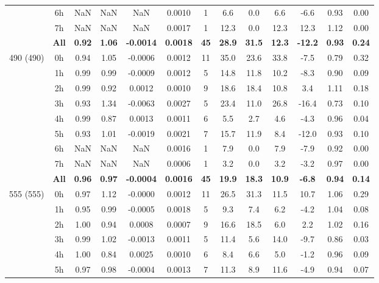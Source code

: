 \documentclass[preview]{standalone}
\begin{document}
\begin{tabular}{ccccccccccccc}
 & 6h  & NaN & NaN & NaN & 0.0010 &  1 & 6.6 & 0.0 & 6.6 & -6.6 & 0.93 & 0.00 \\ 
 & 7h  & NaN & NaN & NaN & 0.0017 &  1 & 12.3 & 0.0 & 12.3 & 12.3 & 1.12 & 0.00 \\ \cline{2-13}
& \textbf{All} & \textbf{0.92} & \textbf{1.06} & \textbf{-0.0014} & \textbf{0.0018} & \textbf{45} & \textbf{28.9} & \textbf{31.5} & \textbf{12.3} & \textbf{-12.2} & \textbf{0.93} & \textbf{0.24} \\ \hline
\multirow{9}{*}{490 (490)} & 0h & 0.94 & 1.05 & -0.0006 & 0.0012 & 11 & 35.0 & 23.6 & 33.8 & -7.5 & 0.79 & 0.32 \\ 
 & 1h  & 0.99 & 0.99 & -0.0009 & 0.0012 &  5 & 14.8 & 11.8 & 10.2 & -8.3 & 0.90 & 0.09 \\ 
 & 2h  & 0.99 & 0.92 & 0.0012 & 0.0010 &  9 & 18.6 & 18.4 & 10.8 & 3.4 & 1.11 & 0.18 \\ 
 & 3h  & 0.93 & 1.34 & -0.0063 & 0.0027 &  5 & 23.4 & 11.0 & 26.8 & -16.4 & 0.73 & 0.10 \\ 
 & 4h  & 0.99 & 0.87 & 0.0013 & 0.0011 &  6 & 5.5 & 2.7 & 4.6 & -4.3 & 0.96 & 0.04 \\ 
 & 5h  & 0.93 & 1.01 & -0.0019 & 0.0021 &  7 & 15.7 & 11.9 & 8.4 & -12.0 & 0.93 & 0.10 \\ 
 & 6h  & NaN & NaN & NaN & 0.0016 &  1 & 7.9 & 0.0 & 7.9 & -7.9 & 0.92 & 0.00 \\ 
 & 7h  & NaN & NaN & NaN & 0.0006 &  1 & 3.2 & 0.0 & 3.2 & -3.2 & 0.97 & 0.00 \\ \cline{2-13}
& \textbf{All} & \textbf{0.96} & \textbf{0.97} & \textbf{-0.0004} & \textbf{0.0016} & \textbf{45} & \textbf{19.9} & \textbf{18.3} & \textbf{10.9} & \textbf{-6.8} & \textbf{0.94} & \textbf{0.14} \\ \hline
\multirow{9}{*}{555 (555)} & 0h & 0.97 & 1.12 & -0.0000 & 0.0012 & 11 & 26.5 & 31.3 & 11.5 & 10.7 & 1.06 & 0.29 \\ 
 & 1h  & 0.95 & 0.99 & -0.0005 & 0.0018 &  5 & 9.3 & 7.4 & 6.2 & -4.2 & 1.04 & 0.08 \\ 
 & 2h  & 1.00 & 0.94 & 0.0008 & 0.0007 &  9 & 16.6 & 18.5 & 6.0 & 2.2 & 1.02 & 0.16 \\ 
 & 3h  & 0.99 & 1.02 & -0.0013 & 0.0011 &  5 & 11.4 & 5.6 & 14.0 & -9.7 & 0.86 & 0.03 \\ 
 & 4h  & 1.00 & 0.84 & 0.0025 & 0.0010 &  6 & 8.4 & 6.6 & 5.0 & -1.2 & 0.96 & 0.09 \\ 
 & 5h  & 0.97 & 0.98 & -0.0004 & 0.0013 &  7 & 11.3 & 8.9 & 11.6 & -4.9 & 0.94 & 0.07 \\ 

\end{tabular}
\end{document}

